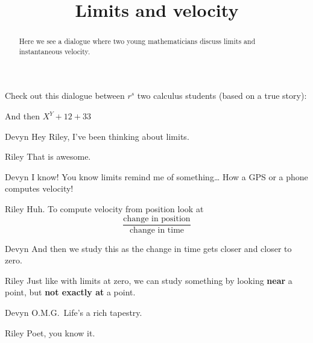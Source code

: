 \documentclass{ximera}
\title[Break-Ground:]{Limits and velocity}
\newcommand{\RS}{r^s}
\begin{document}
\begin{abstract}
Here we see a dialogue where two young mathematicians discuss limits
and instantaneous velocity.
\end{abstract}

\maketitle

\newcommand{\again}[2]{X^Y+#1+#2}

Check out this dialogue between $\RS$ two calculus students (based on a true
story):

And then $\again{12}{33}$

\begin{dialogue}
\item[Devyn] Hey Riley, I've been thinking about limits.
\item[Riley] That is awesome.
\item[Devyn] I know! You know limits remind me of something\dots
  How a GPS or a phone computes velocity!
\item[Riley] Huh. To compute velocity from position look at
  \[
  \frac{\text{change in position}}{\text{change in time}}
  \]
\item[Devyn] And then we study this as the change in time gets closer
  and closer to zero.
\item[Riley] Just like with limits at zero, we can study something by
  looking \textbf{near} a point, but \textbf{not exactly at} a point.
\item[Devyn] O.M.G.\ Life's a rich tapestry.
\item[Riley] Poet, you know it.
\end{dialogue}

\end{document}
